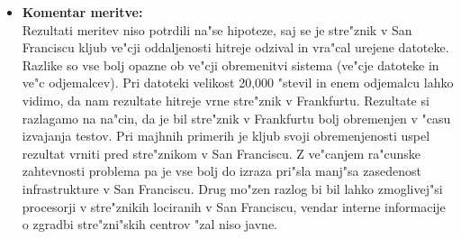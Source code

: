 \begin{itemize}
    \newpage
	\item \textbf{Komentar meritve: } \\ 
		Rezultati meritev niso potrdili na"se hipoteze, saj se je stre"znik v San Franciscu kljub ve"cji oddaljenosti hitreje odzival in vra"cal urejene datoteke. 
		Razlike so vse bolj opazne ob ve"cji obremenitvi sistema (ve"cje datoteke in ve"c odjemalcev). Pri datoteki velikost 20,000 "stevil in enem odjemalcu lahko vidimo, da nam rezultate hitreje vrne stre"znik v Frankfurtu. Rezultate si razlagamo na na"cin, da je bil stre"znik v Frankfurtu bolj obremenjen v "casu izvajanja testov. Pri majhnih primerih je kljub svoji obremenjenosti uspel rezultat vrniti pred stre"znikom v San Franciscu. Z ve"canjem ra"cunske zahtevnosti problema pa je vse bolj do izraza pri"sla manj"sa zasedenost infrastrukture v San Franciscu. Drug mo"zen razlog bi bil lahko zmoglivej"si procesorji v stre"znikih lociranih v San Franciscu, vendar interne informacije o zgradbi stre"zni"skih centrov "zal niso javne.
\end{itemize}

\newpage
